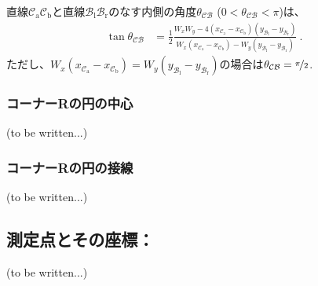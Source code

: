 直線$\mathcal C_\mathrm a\mathcal C_\mathrm b$と直線$\mathcal B_\mathrm l\mathcal B_\mathrm r$のなす内側の角度$\theta_{\mathcal{CB}}$ ($0 < \theta_{\mathcal{CB}} < \pi$)は、
\begin{align*}
  \tan\theta_{\mathcal{CB}}
  &= \frac12
     \frac{W_xW_y
           -4\left(x_{\mathcal C_\mathrm a}-x_{\mathcal C_\mathrm b}\right)
             \left(y_{\mathcal B_\mathrm l}-y_{\mathcal B_\mathrm r}\right)}
          {W_x\left(x_{\mathcal C_\mathrm a}-x_{\mathcal C_\mathrm b}\right)
           -W_y\left(y_{\mathcal B_\mathrm l}-y_{\mathcal B_\mathrm r}\right)}\ .
\end{align*}
ただし、$W_x\left(x_{\mathcal C_\mathrm a}-x_{\mathcal C_\mathrm b}\right) = W_y\left(y_{\mathcal B_\mathrm l}-y_{\mathcal B_\mathrm r}\right)$の場合は$\theta_{\mathcal{CB}} = \nicefrac\pi2$.

\subsubsection{コーナーRの円の中心\TBW}
(to be written...)

\subsubsection{コーナーRの円の接線\TBW}
(to be written...)


\subsection{測定点とその座標：\EndFaceInChamfer\TBW}
(to be written...)
